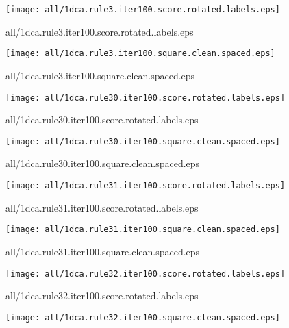 \documentclass{article}
\begin{document}
\begin{center}
\begin{minipage}{\textwidth}
\texttt{[image: all/1dca.rule3.iter100.score.rotated.labels.eps]}
\end{minipage}
\end{center}
{\footnotesize all/1dca.rule3.iter100.score.rotated.labels.eps}
\begin{center}
\begin{minipage}{\textwidth}
\texttt{[image: all/1dca.rule3.iter100.square.clean.spaced.eps]}
\end{minipage}
\end{center}
{\footnotesize all/1dca.rule3.iter100.square.clean.spaced.eps}
\begin{center}
\begin{minipage}{\textwidth}
\texttt{[image: all/1dca.rule30.iter100.score.rotated.labels.eps]}
\end{minipage}
\end{center}
{\footnotesize all/1dca.rule30.iter100.score.rotated.labels.eps}
\begin{center}
\begin{minipage}{\textwidth}
\texttt{[image: all/1dca.rule30.iter100.square.clean.spaced.eps]}
\end{minipage}
\end{center}
{\footnotesize all/1dca.rule30.iter100.square.clean.spaced.eps}
\begin{center}
\begin{minipage}{\textwidth}
\texttt{[image: all/1dca.rule31.iter100.score.rotated.labels.eps]}
\end{minipage}
\end{center}
{\footnotesize all/1dca.rule31.iter100.score.rotated.labels.eps}
\begin{center}
\begin{minipage}{\textwidth}
\texttt{[image: all/1dca.rule31.iter100.square.clean.spaced.eps]}
\end{minipage}
\end{center}
{\footnotesize all/1dca.rule31.iter100.square.clean.spaced.eps}
\begin{center}
\begin{minipage}{\textwidth}
\texttt{[image: all/1dca.rule32.iter100.score.rotated.labels.eps]}
\end{minipage}
\end{center}
{\footnotesize all/1dca.rule32.iter100.score.rotated.labels.eps}
\begin{center}
\begin{minipage}{\textwidth}
\texttt{[image: all/1dca.rule32.iter100.square.clean.spaced.eps]}
\end{minipage}
\end{center}
\end{document}
